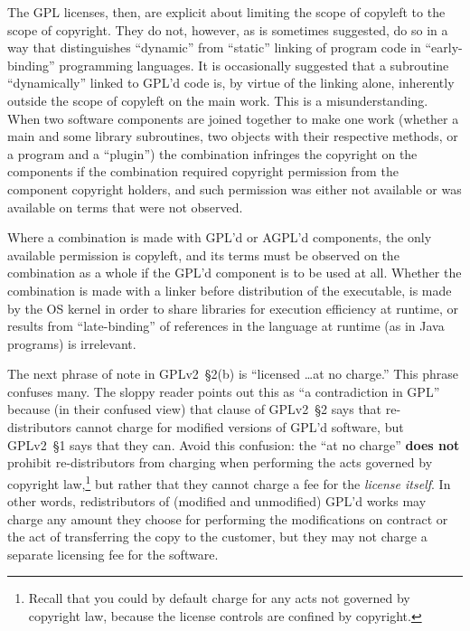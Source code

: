 
The GPL licenses, then, are explicit about limiting the scope of copyleft to
the scope of copyright.  They do not, however, as is sometimes suggested, do
so in a way that distinguishes ``dynamic'' from ``static'' linking of program
code in ``early-binding'' programming languages. It is occasionally suggested
that a subroutine ``dynamically'' linked to GPL’d code is, by virtue of the
linking alone, inherently outside the scope of copyleft on the main
work. This is a misunderstanding. When two software components are joined
together to make one work (whether a main and some library subroutines, two
objects with their respective methods, or a program and a ``plugin'') the
combination infringes the copyright on the components if the combination
required copyright permission from the component copyright holders, and such
permission was either not available or was available on terms that were not
observed.

Where a combination is made with GPL’d or AGPL’d components, the
only available permission is copyleft, and its terms must be observed on the
combination as a whole if the GPL’d component is to be used at all. Whether
the combination is made with a linker before distribution of the executable,
is made by the OS kernel in order to share libraries for execution efficiency
at runtime, or results from ``late-binding'' of references in the language at
runtime (as in Java programs) is irrelevant.
\medskip

\label{GPLv2s2-at-no-charge}
The next phrase of note in GPLv2~\S2(b) is ``licensed \ldots at no charge.''
This phrase  confuses many.  The sloppy reader points out this as ``a
contradiction in GPL'' because (in their confused view) that clause of GPLv2~\S2 says that re-distributors cannot
charge for modified versions of GPL'd software, but GPLv2~\S1 says that
they can.  Avoid this confusion: the ``at no charge'' \textbf{does not} prohibit re-distributors from
charging when performing the acts governed by copyright
law,\footnote{Recall that you could by default charge for any acts not
governed by copyright law, because the license controls are confined
by copyright.} but rather that they cannot charge a fee for the
\emph{license itself}.  In other words, redistributors of (modified
and unmodified) GPL'd works may charge any amount they choose for
performing the modifications on contract or the act of transferring
the copy to the customer, but they may not charge a separate licensing
fee for the software.

